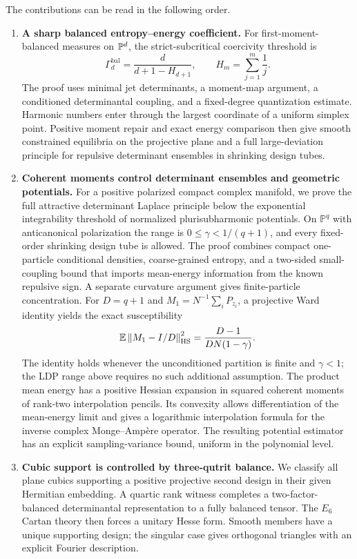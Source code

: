 The contributions can be read in the following order.
\begin{enumerate}[label=\arabic*.]
\item \textbf{A sharp balanced entropy--energy coefficient.}
For first-moment-balanced measures on $\mathbb P^d$, the strict-subcritical
coercivity threshold is
\[
\Gamma_d^{\mathrm{bal}}=\frac{d}{d+1-H_{d+1}},
\qquad H_m=\sum_{j=1}^m\frac1j.
\]
The proof uses minimal jet determinants, a moment-map argument, a conditioned
determinantal coupling, and a fixed-degree quantization estimate. Harmonic
numbers enter through the largest coordinate of a uniform simplex point.
Positive moment repair and exact energy comparison then give smooth
constrained equilibria on the projective plane and a full large-deviation
principle for repulsive determinant ensembles in shrinking design tubes.

\item \textbf{Coherent moments control determinant ensembles and geometric potentials.}
For a positive polarized compact complex manifold, we prove the full
attractive determinant Laplace principle below the exponential integrability
threshold of normalized plurisubharmonic potentials. On $\mathbb P^q$ with
anticanonical polarization the range is $0\le\gamma<1/(q+1)$, and every
fixed-order shrinking design tube is allowed. The proof combines compact
one-particle conditional densities, coarse-grained entropy, and a two-sided
small-coupling bound that imports mean-energy information from the known
repulsive sign. A separate curvature argument gives finite-particle
concentration. For $D=q+1$ and $M_1=N^{-1}\sum_iP_{z_i}$, a projective
Ward identity yields the exact susceptibility
\[
 \mathbb E\left\|M_1-I/D\right\|_{\rm HS}^2
 =\frac{D-1}{DN(1-\gamma)}.
\]
The identity holds whenever the unconditioned partition is finite and
$\gamma<1$; the LDP range above requires no such additional assumption.
The product mean energy has a positive Hessian expansion in squared
coherent moments of rank-two interpolation pencils. Its convexity
allows differentiation of the mean-energy limit and gives a logarithmic
interpolation formula for the inverse complex Monge--Amp\`ere operator.
The resulting potential estimator has an explicit sampling-variance
bound, uniform in the polynomial level.

\item \textbf{Cubic support is controlled by three-qutrit balance.}
We classify all plane cubics supporting a positive projective second design
in their given Hermitian embedding. A quartic rank witness completes a
two-factor-balanced determinantal representation to a fully balanced tensor.
The $E_6$ Cartan theory then forces a unitary Hesse form. Smooth members have
a unique supporting design; the singular case gives orthogonal triangles
with an explicit Fourier description.


\end{enumerate}
